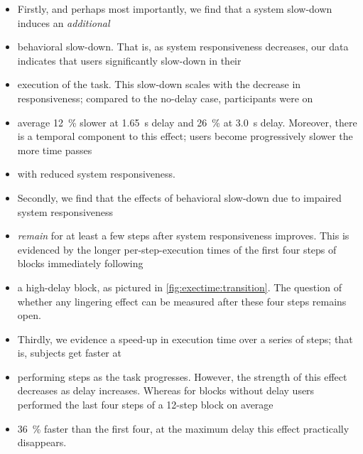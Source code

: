 \begin{itemize}
    \item Firstly, and perhaps most importantly, we find that a system slow-down induces an \textit{additional}
    \item behavioral slow-down.
    That is, as system responsiveness decreases, our data indicates that users significantly slow-down in their
    \item execution of the task.
    This slow-down scales with the decrease in responsiveness; compared to the no-delay case, participants were on
    \item average \SI{12}{\percent} slower at \SI{1.65}{\second} delay and \SI{26}{\percent} at \SI{3.0}{\second} delay.
    Moreover, there is a temporal component to this effect; users become progressively slower the more time passes
    \item with reduced system responsiveness.

    \item Secondly, we find that the effects of behavioral slow-down due to impaired system responsiveness
    \item \emph{remain} for at least a few steps after system responsiveness improves.
    This is evidenced by the longer per-step-execution times of the first four steps of blocks immediately following
    \item a high-delay block, as pictured in \cref{fig:exectime:transition}.
    The question of whether any lingering effect can be measured after these four steps remains open.

    \item Thirdly, we evidence a speed-up in execution time over a series of steps; that is, subjects get faster at
    \item performing steps as the task progresses.
    However, the strength of this effect decreases as delay increases.
    Whereas for blocks without delay users performed the last four steps of a 12-step block on average
    \item \SI{36}{\percent} faster than the first four, at the maximum delay this effect practically disappears.


\end{itemize}
